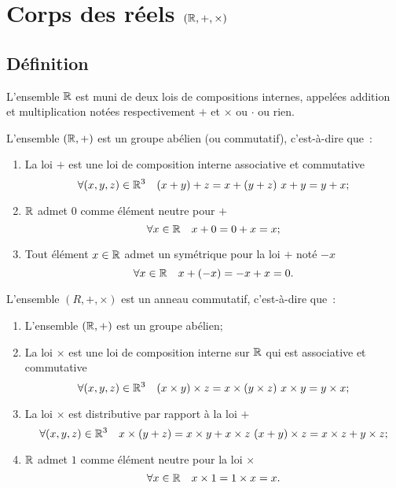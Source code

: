 \section{Corps des réels \((\mathbb{R},+,\times)\)}

\subsection{Définition}

L'ensemble \(\mathbb{R}\) est muni de deux lois de compositions internes, appelées addition et multiplication notées respectivement \(+\) et \(\times\) ou \(\cdot\) ou rien.
\begin{prop}
  L'ensemble \((\mathbb{R},+)\) est un groupe abélien (ou commutatif), c'est-à-dire que~:
  \begin{enumerate}
  \item La loi \(+\) est une loi de composition interne associative et commutative
    \begin{equation}
      \forall (x,y,z) \in \R^3 \quad (x+y)+z=x+(y+z) \ x+y=y+x;
    \end{equation}
  \item \(\mathbb{R}\) admet \(0\) comme élément neutre pour \(+\)
    \begin{equation}
      \forall x \in \mathbb{R} \quad x+0=0+x=x;
    \end{equation}
  \item Tout élément \(x\in\mathbb{R}\) admet un symétrique pour la loi \(+\) noté \(-x\)
    \begin{equation}
      \forall x \in \mathbb{R} \quad x+(-x)=-x+x=0.
    \end{equation}
  \end{enumerate}
\end{prop}
\begin{prop}
  L'ensemble \((R,+,\times)\) est un anneau commutatif, c'est-à-dire que~:
  \begin{enumerate}
  \item L'ensemble \((\mathbb{R},+)\) est un groupe abélien;
  \item La loi \(\times\) est une loi de composition interne sur \(\mathbb{R}\) qui est associative et commutative
    \begin{equation}
      \forall (x,y,z) \in \mathbb{R}^3 \quad (x\times y)\times z=x\times (y\times z) \ x\times y=y\times x;
    \end{equation}
  \item La loi \(\times\) est distributive par rapport à la loi \(+\)
    \begin{equation}
      \forall (x,y,z) \in \mathbb{R}^3 \quad x\times(y+z)=x\times y+x\times z \ (x+y)\times z=x\times z+y\times z;
    \end{equation}
  \item \(\mathbb{R}\) admet \(1\) comme élément neutre pour la loi \(\times\)
    \begin{equation}
      \forall x \in \mathbb{R} \quad x\times 1=1\times x=x.
    \end{equation}
  \end{enumerate}
\end{prop}
